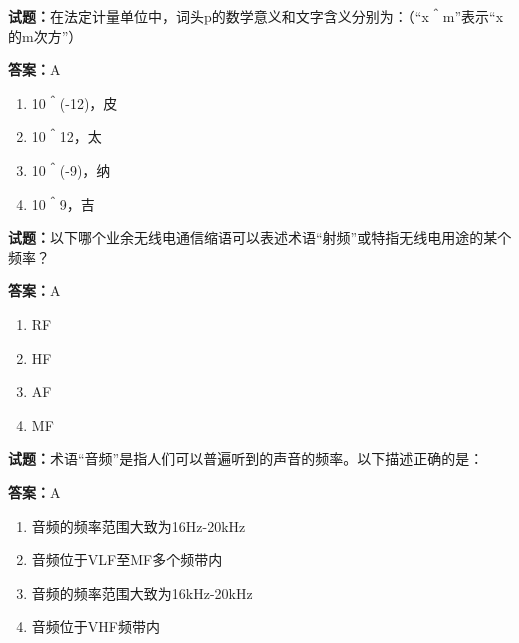 \documentclass{ctexbook}
\begin{document}




\vspace{1em}

\textbf{试题：}在法定计量单位中，词头p的数学意义和文字含义分别为：（“x＾m”表示“x的m次方”） 

\textbf{答案：}A 

\begin{enumerate}[leftmargin=3em]
  \item 10＾(-12)，皮 

  \item 10＾12，太 

  \item 10＾(-9)，纳 

  \item 10＾9，吉 

\end{enumerate}





\vspace{1em}

\textbf{试题：}以下哪个业余无线电通信缩语可以表述术语“射频”或特指无线电用途的某个频率？ 

\textbf{答案：}A 

\begin{enumerate}[leftmargin=3em]
  \item RF 

  \item HF 

  \item AF 

  \item MF 

\end{enumerate}





\vspace{1em}

\textbf{试题：}术语“音频”是指人们可以普遍听到的声音的频率。以下描述正确的是： 

\textbf{答案：}A 

\begin{enumerate}[leftmargin=3em]
  \item 音频的频率范围大致为16Hz-20kHz 

  \item 音频位于VLF至MF多个频带内 

  \item 音频的频率范围大致为16kHz-20kHz 

  \item 音频位于VHF频带内 

\end{enumerate}
\end{document}

